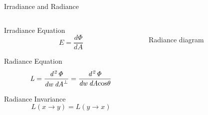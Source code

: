 \documentclass[10pt,compress,professionalfont]{beamer}
\begin{document}
\begin{frame}{Irradiance and Radiance}

    \begin{columns}
        \begin{column}{0.5\textwidth}
                \begin{block}{Irradiance Equation}
                    \[
                    E = \frac{d\Phi}{dA}
                    \]
                \end{block}
            \begin{block}{Radiance Equation}
                \[
                \mathit{L} = \frac{\mathit{d^{2}\Phi}}{\mathit{dw\:dA}^\perp} = \frac{\mathit{d^{2}\Phi}}{\mathit{dw\:dA}\textup{cos}\theta}
                \]
            \end{block}
            \begin{block}{Radiance Invariance}
                \[
                    L(x \to y) = L(y \to x)
                \]
            \end{block}
        \end{column}
        \begin{column}{0.5\textwidth}
            \vspace{-5mm}
            {\centering
            \includegraphics[width=\textwidth]{../img/diag/radiance.pdf}\\
            \scriptsize Radiance diagram\\
            }
        \end{column}
    \end{columns}



\end{frame}
\end{document}
